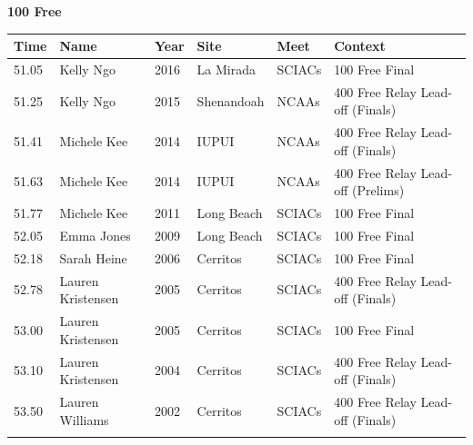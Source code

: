 \clearpage
\noindent\begin{minipage}[t]{0.98\textwidth}
\centering
\textbf{\textcolor{teamprimary}{100 Free}}\par
\vspace{0.5em}
\centering
\small
\renewcommand{\arraystretch}{1.0}
\setlength{\tabcolsep}{4pt}
\begin{tabular}{@{}p{2.0cm}p{3.2cm}p{1.2cm}p{2.0cm}p{2.0cm}p{2.5cm}@{}}
\toprule
\textbf{Time} & \textbf{Name} & \textbf{Year} & \textbf{Site} & \textbf{Meet} & \textbf{Context} \\
\midrule
51.05 & Kelly Ngo & 2016 & La Mirada & SCIACs & 100 Free Final \\
51.25 & Kelly Ngo & 2015 & Shenandoah & NCAAs & 400 Free Relay Lead-off (Finals) \\
51.41 & Michele Kee & 2014 & IUPUI & NCAAs & 400 Free Relay Lead-off (Finals) \\
51.63 & Michele Kee & 2014 & IUPUI & NCAAs & 400 Free Relay Lead-off (Prelims) \\
51.77 & Michele Kee & 2011 & Long Beach & SCIACs & 100 Free Final  \\
52.05 & Emma Jones & 2009 & Long Beach & SCIACs & 100 Free Final  \\
52.18 & Sarah Heine & 2006 & Cerritos & SCIACs & 100 Free Final  \\
52.78 & Lauren Kristensen & 2005 & Cerritos & SCIACs & 400 Free Relay Lead-off (Finals) \\
53.00 & Lauren Kristensen & 2005 & Cerritos & SCIACs & 100 Free Final \\
53.10 & Lauren Kristensen & 2004 & Cerritos & SCIACs & 400 Free Relay Lead-off (Finals) \\
53.50 & Lauren Williams & 2002 & Cerritos & SCIACs & 400 Free Relay Lead-off (Finals) \\
\bottomrule
\vspace{0.5em}
\end{tabular}
\end{minipage}
\vspace{1.2em}
